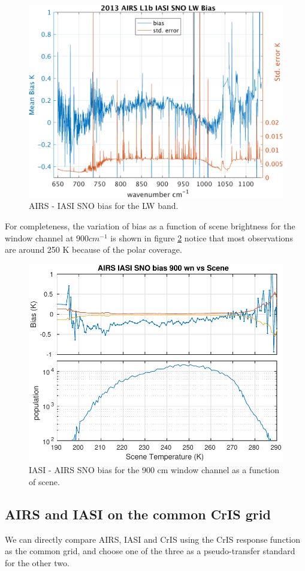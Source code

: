 \documentclass[11pt]{article}
\begin{document}
\begin{figure}[htb]
\centering
\includegraphics[width=.6\linewidth]{./figs/AI_SNO_2013_biasStdErr_LW.png}
\caption{\label{fig:orgparagraph19}
  AIRS - IASI SNO bias for the LW band.}
\label{fig:Z1}
\end{figure}

For completeness, the variation of bias as a function of scene brightness for the window channel at $ 900 cm^{-1} $ is shown in figure \ref{fig:Z2} notice that most observations are around 250 K because of the polar coverage.

\begin{figure}[htb]
\centering
\includegraphics[width=.6\linewidth]{./figs/AI_jplSNO_bias_std_900wn_vScene.pdf}
\caption{\label{fig:orgparagraph20}
   IASI - AIRS SNO bias for the 900 cm window channel as a function of scene.}
\label{fig:Z2}
\end{figure}



\subsection{AIRS and IASI on the common CrIS grid}
\label{sec:orgheadline11}
 We can directly compare AIRS, IASI and CrIS using the CrIS response function as the common grid, and choose one of the three as a pseudo-transfer standard for the other two.
\end{document}
